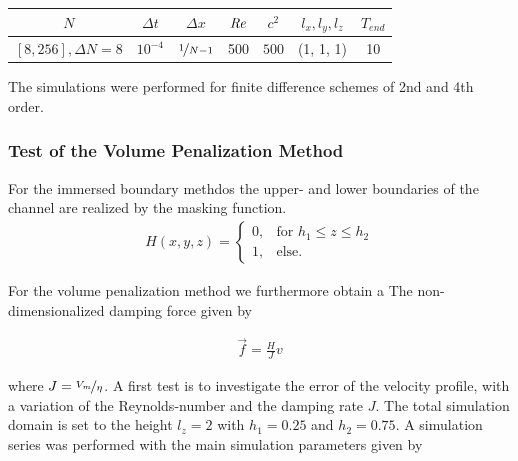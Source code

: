 \begin{center}
\vspace*{0.7ex}
\begin{tabular}{c|c|c|c|c|c|c }
 $ N  $                   & $\Delta t$ & $\Delta x$            & $\mbox{\textit{Re}}$  & $c^2$   & $l_x, l_y, l_z$ & $T_{end}$\\
\hline
 $[8, 256], \Delta N = 8 $& $10^{-4}$ & $\nicefrac{1}{N - 1}$ & 500     & $500$   & (1, 1, 1)       & 10\\
\end{tabular}
\vspace*{0.7ex}
\end{center}

The simulations were performed for finite difference schemes of 2nd and 4th order.

\subsubsection{Test of the Volume Penalization Method}


For the immersed boundary methdos the upper- and lower boundaries of the channel are realized by the masking function.
\begin{align}
H(x, y, z) = \begin{cases}
                    0, & \text{for \  }  h_1 \leq z \leq h_2 \\
                    1, & \text{else}.
             \end{cases}
\end{align}

For the volume penalization method we furthermore obtain a
The non-dimensionalized damping force  given by

\begin{align}
    \vec{f} = \frac{H}{J}v
\end{align}

where $J = \nicefrac{V_{m}}{\eta}$.
A first test is to investigate the error of the velocity profile, with a variation of the Reynolds-number and the damping rate $J$.
The total simulation domain is set to the height $l_z=2$ with $h_1=0.25$ and $h_2=0.75$.
A simulation series was performed with the main simulation parameters given by


